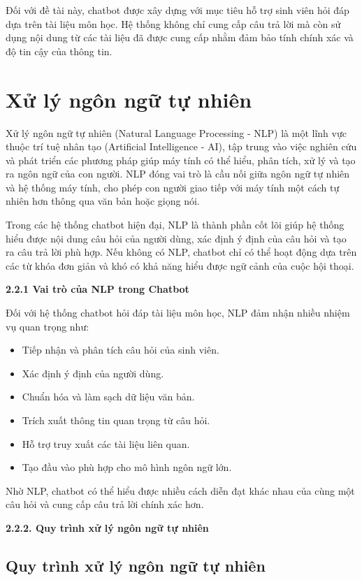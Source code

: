 \documentclass[12pt,a4paper]{report}
\begin{document}
Đối với đề tài này, chatbot được xây dựng với mục tiêu hỗ trợ sinh viên hỏi đáp dựa trên tài liệu môn học. Hệ thống không chỉ cung cấp câu trả lời mà còn sử dụng nội dung từ các tài liệu đã được cung cấp nhằm đảm bảo tính chính xác và độ tin cậy của thông tin.
	
	\section{Xử lý ngôn ngữ tự nhiên}
	
	Xử lý ngôn ngữ tự nhiên (Natural Language Processing - NLP) là một lĩnh vực thuộc trí tuệ nhân tạo (Artificial Intelligence - AI), tập trung vào việc nghiên cứu và phát triển các phương pháp giúp máy tính có thể hiểu, phân tích, xử lý và tạo ra ngôn ngữ của con người. NLP đóng vai trò là cầu nối giữa ngôn ngữ tự nhiên và hệ thống máy tính, cho phép con người giao tiếp với máy tính một cách tự nhiên hơn thông qua văn bản hoặc giọng nói.
	
	Trong các hệ thống chatbot hiện đại, NLP là thành phần cốt lõi giúp hệ thống hiểu được nội dung câu hỏi của người dùng, xác định ý định của câu hỏi và tạo ra câu trả lời phù hợp. Nếu không có NLP, chatbot chỉ có thể hoạt động dựa trên các từ khóa đơn giản và khó có khả năng hiểu được ngữ cảnh của cuộc hội thoại.
	
\textbf{2.2.1 Vai trò của NLP trong Chatbot}
	
	Đối với hệ thống chatbot hỏi đáp tài liệu môn học, NLP đảm nhận nhiều nhiệm vụ quan trọng như:
	
	\begin{itemize}
		\item Tiếp nhận và phân tích câu hỏi của sinh viên.
		\item Xác định ý định của người dùng.
		\item Chuẩn hóa và làm sạch dữ liệu văn bản.
		\item Trích xuất thông tin quan trọng từ câu hỏi.
		\item Hỗ trợ truy xuất các tài liệu liên quan.
		\item Tạo đầu vào phù hợp cho mô hình ngôn ngữ lớn.
	\end{itemize}
	
	Nhờ NLP, chatbot có thể hiểu được nhiều cách diễn đạt khác nhau của cùng một câu hỏi và cung cấp câu trả lời chính xác hơn.
	
\textbf{2.2.2. Quy trình xử lý ngôn ngữ tự nhiên}
	
	\subsection{Quy trình xử lý ngôn ngữ tự nhiên}
	
\end{document}
